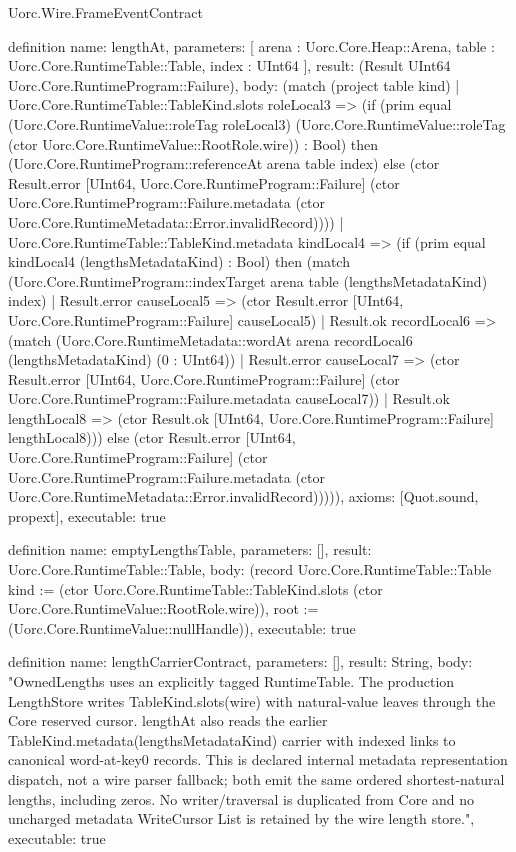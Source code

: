 \begin{lexlean}{Uorc.Wire.FrameEventContract}
\begin{semanticmodule}
definition{
  name: lengthAt,
  parameters: [
    arena : Uorc.Core.Heap::Arena,
    table : Uorc.Core.RuntimeTable::Table,
    index : UInt64
  ],
  result: (Result UInt64 Uorc.Core.RuntimeProgram::Failure),
  body: (match (project table kind)
    | Uorc.Core.RuntimeTable::TableKind.slots roleLocal3 => (if (prim equal (Uorc.Core.RuntimeValue::roleTag roleLocal3) (Uorc.Core.RuntimeValue::roleTag (ctor Uorc.Core.RuntimeValue::RootRole.wire)) : Bool) then (Uorc.Core.RuntimeProgram::referenceAt arena table index) else (ctor Result.error [UInt64, Uorc.Core.RuntimeProgram::Failure] (ctor Uorc.Core.RuntimeProgram::Failure.metadata (ctor Uorc.Core.RuntimeMetadata::Error.invalidRecord))))
    | Uorc.Core.RuntimeTable::TableKind.metadata kindLocal4 => (if (prim equal kindLocal4 (lengthsMetadataKind) : Bool) then (match (Uorc.Core.RuntimeProgram::indexTarget arena table (lengthsMetadataKind) index)
      | Result.error causeLocal5 => (ctor Result.error [UInt64, Uorc.Core.RuntimeProgram::Failure] causeLocal5)
      | Result.ok recordLocal6 => (match (Uorc.Core.RuntimeMetadata::wordAt arena recordLocal6 (lengthsMetadataKind) (0 : UInt64))
        | Result.error causeLocal7 => (ctor Result.error [UInt64, Uorc.Core.RuntimeProgram::Failure] (ctor Uorc.Core.RuntimeProgram::Failure.metadata causeLocal7))
        | Result.ok lengthLocal8 => (ctor Result.ok [UInt64, Uorc.Core.RuntimeProgram::Failure] lengthLocal8))) else (ctor Result.error [UInt64, Uorc.Core.RuntimeProgram::Failure] (ctor Uorc.Core.RuntimeProgram::Failure.metadata (ctor Uorc.Core.RuntimeMetadata::Error.invalidRecord))))),
  axioms: [Quot.sound, propext],
  executable: true
}

definition{
  name: emptyLengthsTable,
  parameters: [],
  result: Uorc.Core.RuntimeTable::Table,
  body: (record Uorc.Core.RuntimeTable::Table {kind := (ctor Uorc.Core.RuntimeTable::TableKind.slots (ctor Uorc.Core.RuntimeValue::RootRole.wire)), root := (Uorc.Core.RuntimeValue::nullHandle)}),
  executable: true
}

definition{
  name: lengthCarrierContract,
  parameters: [],
  result: String,
  body: "OwnedLengths uses an explicitly tagged RuntimeTable. The production LengthStore writes TableKind.slots(wire) with natural-value leaves through the Core reserved cursor. lengthAt also reads the earlier TableKind.metadata(lengthsMetadataKind) carrier with indexed links to canonical word-at-key0 records. This is declared internal metadata representation dispatch, not a wire parser fallback; both emit the same ordered shortest-natural lengths, including zeros. No writer/traversal is duplicated from Core and no uncharged metadata WriteCursor List is retained by the wire length store.",
  executable: true
}
\end{semanticmodule}
\end{lexlean}
